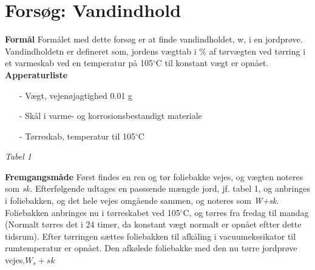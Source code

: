 \chapter{Forsøg: Vandindhold}

\textbf{Formål}
\newline
Formålet med dette forsøg er at finde vandindholdet, w, i en jordprøve. Vandindholdetn er defineret som, jordens vægttab i \% af tørvægten ved tørring i et varmeskab ved en temperatur på 105$^{\circ}$C til konstant vægt er opnået.
\newline
\newline
\textbf{Apperaturliste}
\begin{itemize}
\item[-] Vægt, vejenøjagtighed 0.01 g
\item[-] Skål i varme- og korrosionsbestandigt materiale
\item[-] Tørreskab, temperatur til 105$^{\circ}$C
\end{itemize}

\textit{Tabel 1}

\textbf{Fremgangsmåde}
\newline
Først findes en ren og tør foliebakke vejes, og vægten noteres som \textit{sk.} Efterfølgende udtages en passsende mængde jord, jf. tabel 1, og anbringes i foliebakken, og det hele vejes omgående sammen, og noteres som \textit{W+sk}.
\newline
Foliebakken anbringes nu i tørreskabet ved 105$^{\circ}$C, og tørres fra fredag til mandag (Normalt tørres det i 24 timer, da konstant vægt normalt er opnået eftter dette tidsrum). Efter tørringen sættes foliebakken til afkåling i vacuumekssikator til rumtemperatur er opnået. Den afkølede foliebakke med den nu tørre jordprøve vejes,\textit{$W_{s}+sk$}
